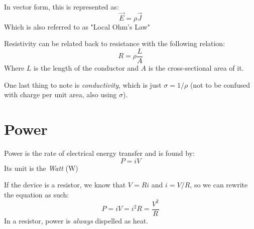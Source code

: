 \documentclass[]{article}
\begin{document}
In vector form, this is represented as:
\[ \vec{E} = \rho \vec{J} \]
Which is also referred to as "Local Ohm's Law"

Resistivity can be related back to resistance with the following relation:
\[ R = \rho \frac{L}{A} \]
Where $ L $ is the length of the conductor and $ A $ is the cross-sectional area of it.

One last thing to note is \emph{conductivity}, which is just $ \sigma = 1 / \rho $ (not to be confused with charge per unit area, also using $ \sigma $).

\section{Power}
Power is the rate of electrical energy transfer and is found by:
\[ P = iV \]
Its unit is the \emph{Watt} (\unit{\watt})

If the device is a resistor, we know that $ V = Ri $ and $ i = V / R $, so we can rewrite the equation as such:
\[ P = iV = i^2 R = \frac{V^2}{R} \]
In a resistor, power is \emph{always} dispelled as heat.
\end{document}
